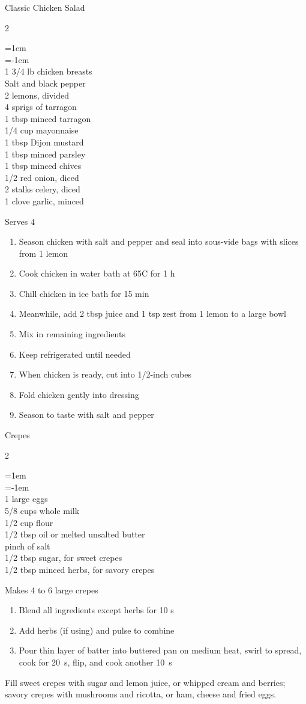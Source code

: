 \documentclass{article}
\newenvironment{recipe}[2]
    {\clearpage
    \begin{FlushLeft}
    \textrm{{\large#1}\hfill{\large\tabularnums{#2}}}
    \vspace{0.5em}
    \columnratio{0.333}
    \setlength{\columnsep}{0.2in}
    \begin{paracol}{2}}
    {\end{paracol}\end{FlushLeft}}
\newenvironment{denserecipe}[2]
    {\small
    \begin{recipe}{#1}{#2}}
    {\end{recipe}}
\newcommand{\nextcolumn}{\switchcolumn}
\newenvironment{ingredients}
    {
    \begin{obeylines}
    \vspace{\parskip}
    \setlength{\parskip}{0.25em}
    \vspace{-0.25em}
    \leftskip=1em
    \parindent=-1em}
    {\end{obeylines}}
\newenvironment{steps}
    {\begin{enumerate}[leftmargin=*,topsep=0pt]}
    {\end{enumerate}}
\newcommand{\celsius}[1]{#1\textdegree{}C}
\newcommand{\tag}[1]{\hspace{1em}#1}
\newcommand{\symboltag}[2]{\tag{#1\hspace{0.4em}#2}}
\newcommand{\totaltime}[1]{\symboltag{\raisebox{-0.1em}{\small\StopWatchEnd}}{#1}}
\begin{document}
\begin{denserecipe}{Classic Chicken Salad}{\totaltime{2 h}}
\begin{ingredients}
1 3/4 lb chicken breasts
Salt and black pepper
2 lemons, divided
4 sprigs of tarragon
1 tbsp minced tarragon
1/4 cup mayonnaise
1 tbsp Dijon mustard
1 tbsp minced parsley
1 tbsp minced chives
1/2 red onion, diced
2 stalks celery, diced
1 clove garlic, minced
\end{ingredients}
\nextcolumn
Serves 4
\begin{steps}
    \item Season chicken with salt and pepper and seal into sous-vide bags with slices from 1 lemon
    \item Cook chicken in water bath at \celsius{65} for 1 h
    \item Chill chicken in ice bath for 15 min
    \item Meanwhile, add 2 tbsp juice and 1 tsp zest from 1 lemon to a large bowl
    \item Mix in remaining ingredients
    \item Keep refrigerated until needed
    \item When chicken is ready, cut into 1/2-inch cubes
    \item Fold chicken gently into dressing
    \item Season to taste with salt and pepper
\end{steps}
\end{denserecipe}

\begin{recipe}{Crepes}{\totaltime{15 min}}
\begin{ingredients}
1 large eggs
5/8 cups whole milk
1/2 cup flour
1/2 tbsp oil or melted unsalted butter
pinch of salt
1/2 tbsp sugar, for sweet crepes
1/2 tbsp minced herbs, for savory crepes
\end{ingredients}
\nextcolumn
Makes 4 to 6 large crepes
\begin{steps}
    \item Blend all ingredients except herbs for 10 s
    \item Add herbs (if using) and pulse to combine
    \item Pour thin layer of batter into buttered pan on medium heat, swirl to spread, cook for 20~s, flip, and cook another 10~s
\end{steps}
Fill sweet crepes with sugar and lemon juice, or whipped cream and berries; savory crepes with mushrooms and ricotta, or ham, cheese and fried eggs.
\end{recipe}
\end{document}
